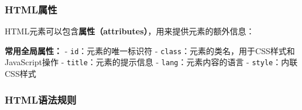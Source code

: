 \subsubsection{HTML属性}\label{htmlux5c5eux6027}

HTML元素可以包含\textbf{属性（attributes）}，用来提供元素的额外信息：

\begin{Shaded}
\begin{Highlighting}[]
\DataTypeTok{\textless{}}\OperatorTok{=}\OperatorTok{=}\OperatorTok{=}\OperatorTok{=}\DataTypeTok{\textgreater{}}
\DataTypeTok{\textless{}}\OperatorTok{=}\OperatorTok{=}\OperatorTok{=}\DataTypeTok{\textgreater{}}\DataTypeTok{\textless{}/}\DataTypeTok{\textgreater{}}
\end{Highlighting}
\end{Shaded}

\textbf{常用全局属性：} - \texttt{id}：元素的唯一标识符 - \texttt{class}：元素的类名，用于CSS样式和JavaScript操作 - \texttt{title}：元素的提示信息 - \texttt{lang}：元素内容的语言 - \texttt{style}：内联CSS样式

\subsubsection{HTML语法规则}\label{htmlux8bedux6cd5ux89c4ux5219}

